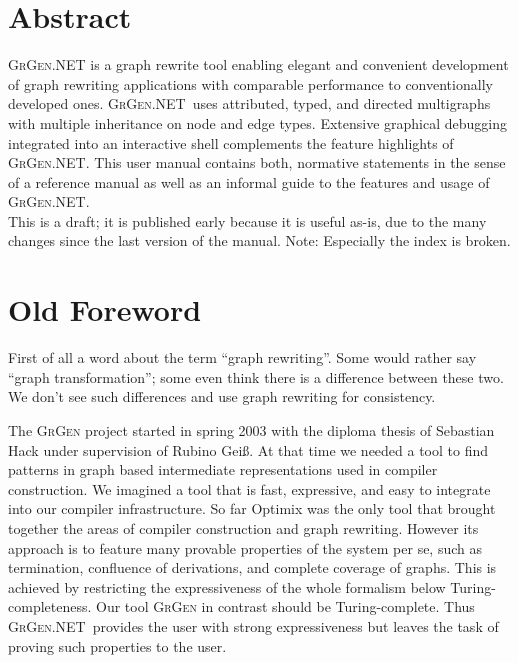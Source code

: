 \documentclass[a4paper,final,11pt]{book}
\providecommand{\GrG}{{\scshape GrGen.NET}}
\begin{document}
\chapter*{Abstract}


\noindent \textsc{GrGen.NET} is a graph rewrite tool enabling elegant and convenient development of graph rewriting applications with comparable performance to conventionally developed ones.
\GrG\ uses attributed, typed, and directed multigraphs with multiple inheritance on node and edge types.
Extensive graphical debugging integrated into an interactive shell complements the feature highlights of \GrG.
This user manual contains both, normative statements in the sense of a reference manual as well as an informal guide to the features and usage of \GrG.\\[6ex]

\noindent This is a draft; it is published early because it is useful as-is, due to the many changes since the last version of the manual. 
Note: Especially the index is broken.


\chapter*{Old Foreword}
First of all a word about the term ``graph rewriting''.
Some would rather say ``graph transformation''; some even think there is a difference between these two.
We don't see such differences and use graph rewriting for consistency.

The \textsc{GrGen} project started in spring 2003 with the diploma thesis of Sebastian Hack under supervision of Rubino Gei\ss.
At that time we needed a tool to find patterns in graph based intermediate representations used in compiler construction.
We imagined a tool that is fast, expressive, and easy to integrate into our compiler infrastructure.
So far Optimix\cite{assmann00graph} was the only tool that brought together the areas of compiler construction and graph rewriting.
However its approach is to feature many provable properties of the system per se, such as termination, confluence of derivations, and complete coverage of graphs.
This is achieved by restricting the expressiveness of the whole formalism below Turing-completeness.
Our tool \textsc{GrGen} in contrast should be Turing-complete.
Thus \GrG\ provides the user with strong expressiveness but leaves the task of proving such properties to the user.
\end{document}
